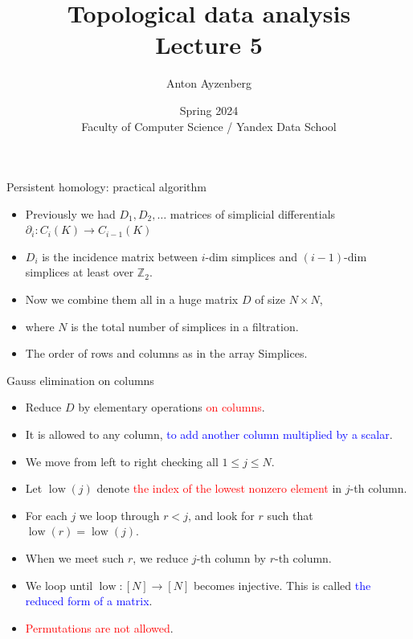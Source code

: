 \documentclass[10pt,xcolor={usenames}]{beamer}
\title[Topology intro]{Topological data analysis \\ Lecture 5}
\author[Anton Ayzenberg]{ Anton Ayzenberg }%
\date[FCS-YDS'24]{Spring 2024 \\ Faculty of Computer Science / Yandex Data School}
\institute[ATA \& Noeon Research]{ATA Lab, FCS NRU HSE \\ Noeon Research}
\DeclareMathOperator{\low}{low}
\newcommand{\Zo}{\mathbb{Z}}
\newcommand{\Zt}{\Zo_2}
\newcommand{\dd}{\partial}
\begin{document}
\maketitle


\begin{frame}{Persistent homology: practical algorithm}

\begin{itemize}
  \item Previously we had $D_1,D_2,\ldots$ matrices of simplicial differentials $\dd_i\colon C_i(K)\to C_{i-1}(K)$
  \item $D_i$ is the incidence matrix between $i$-dim simplices and $(i-1)$-dim simplices at least over $\Zt$.
  \item Now we combine them all in a huge matrix $D$ of size $N\times N$,
  \item where $N$ is the total number of simplices in a filtration.
  \item The order of rows and columns as in the array Simplices.
\end{itemize}
\end{frame}

\begin{frame}{Gauss elimination on columns}

\begin{itemize}
  \item Reduce $D$ by elementary operations \textcolor{red}{on columns}.
  \item It is allowed to any column, \textcolor{blue}{to add another column multiplied by a scalar}.
  \item We move from left to right checking all $1\leqslant j \leqslant N$.
  \item Let $\low(j)$ denote \textcolor{red}{the index of the lowest nonzero element} in $j$-th column.
  \item For each $j$ we loop through $r<j$, and look for $r$ such that $\low(r)=\low(j)$.
  \item When we meet such $r$, we reduce $j$-th column by $r$-th column.
  \item We loop until $\low\colon[N]\to[N]$ becomes injective. This is called \textcolor{blue}{the reduced form of a matrix}.
  \item \textcolor{red}{Permutations are not allowed}.
\end{itemize}
\end{frame}
\end{document}
